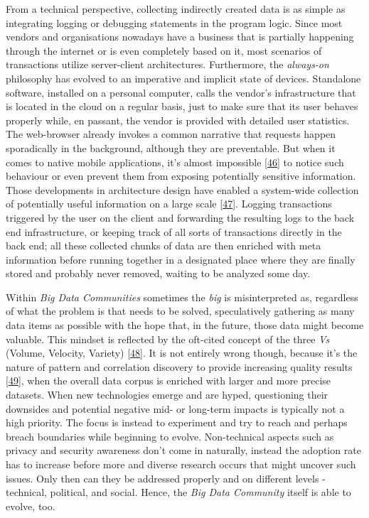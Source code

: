 \documentclass[12pt,english,a4paper,titlepage,cleardoublepage=empty,dottedtoc]{report}
\begin{document}
From a technical perspective, collecting indirectly created data is as
simple as integrating logging or debugging statements in the program
logic. Since most vendors and organisations nowadays have a business
that is partially happening through the internet or is even completely
based on it, most scenarios of transactions utilize server-client
architectures. Furthermore, the \emph{always-on} philosophy has evolved
to an imperative and implicit state of devices. Standalone software,
installed on a personal computer, calls the vendor's infrastructure that
is located in the cloud on a regular basis, just to make sure that its
user behaves properly while, en passant, the vendor is provided with
detailed user statistics. The web-browser already invokes a common
narrative that requests happen sporadically in the background, although
they are preventable. But when it comes to native mobile applications,
it's almost impossible
{[}\protect\hyperlink{ref-web_2016_answers-io}{46}{]} to notice such
behaviour or even prevent them from exposing potentially sensitive
information. Those developments in architecture design have enabled a
system-wide collection of potentially useful information on a large
scale
{[}\protect\hyperlink{ref-web_2016_big-data-enthusiasts-should-not-ignore}{47}{]}.
Logging transactions triggered by the user on the client and forwarding
the resulting logs to the back end infrastructure, or keeping track of
all sorts of transactions directly in the back end; all these collected
chunks of data are then enriched with meta information before running
together in a designated place where they are finally stored and
probably never removed, waiting to be analyzed some day.

Within \emph{Big Data Communities} sometimes the \emph{big} is
misinterpreted as, regardless of what the problem is that needs to be
solved, speculatively gathering as many data items as possible with the
hope that, in the future, those data might become valuable. This mindset
is reflected by the oft-cited concept of the three \emph{Vs} (Volume,
Velocity, Variety)
{[}\protect\hyperlink{ref-report_2001_3d-data-management-controlling-data-volume-velocity-and-variety}{48}{]}.
It is not entirely wrong though, because it's the nature of pattern and
correlation discovery to provide increasing quality results
{[}\protect\hyperlink{ref-paper_2015_big-data-for-development-a-review-of-promises-and-challenges:more-data}{49}{]},
when the overall data corpus is enriched with larger and more precise
datasets. When new technologies emerge and are hyped, questioning their
downsides and potential negative mid- or long-term impacts is typically
not a high priority. The focus is instead to experiment and try to reach
and perhaps breach boundaries while beginning to evolve. Non-technical
aspects such as privacy and security awareness don't come in naturally,
instead the adoption rate has to increase before more and diverse
research occurs that might uncover such issues. Only then can they be
addressed properly and on different levels - technical, political, and
social. Hence, the \emph{Big Data Community} itself is able to evolve,
too.
\end{document}
